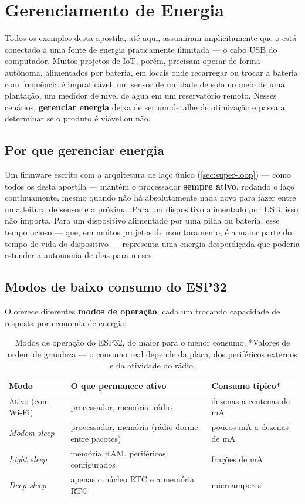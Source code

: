 \chapter{Gerenciamento de Energia}
\label{cap:energia}

Todos os exemplos desta apostila, até aqui, assumiram implicitamente que o \ESP{} está conectado a uma fonte de energia praticamente ilimitada — o cabo USB do computador. Muitos projetos de IoT, porém, precisam operar de forma autônoma, alimentados por bateria, em locais onde recarregar ou trocar a bateria com frequência é impraticável: um sensor de umidade de solo no meio de uma plantação, um medidor de nível de água em um reservatório remoto. Nesses cenários, \textbf{gerenciar energia} deixa de ser um detalhe de otimização e passa a determinar se o produto é viável ou não.

\section{Por que gerenciar energia}

Um firmware escrito com a arquitetura de laço único (\cref{sec:super-loop}) — como todos os desta apostila — mantém o processador \textbf{sempre ativo}, rodando o laço  continuamente, mesmo quando não há absolutamente nada novo para fazer entre uma leitura de sensor e a próxima. Para um dispositivo alimentado por USB, isso não importa. Para um dispositivo alimentado por uma pilha ou bateria, esse tempo ocioso — que, em muitos projetos de monitoramento, é a maior parte do tempo de vida do dispositivo — representa uma energia desperdiçada que poderia estender a autonomia de dias para meses.

\section{Modos de baixo consumo do ESP32}

O \ESP{} oferece diferentes \textbf{modos de operação}, cada um trocando capacidade de resposta por economia de energia:

\begin{table}[h]
\centering
\begin{tabularx}{\textwidth}{@{}lXX@{}}
\toprule
\textbf{Modo} & \textbf{O que permanece ativo} & \textbf{Consumo típico*} \\
\midrule
Ativo (com Wi-Fi)  & processador, memória, rádio  & dezenas a centenas de mA \\
\emph{Modem-sleep}  & processador, memória (rádio dorme entre pacotes) & poucos mA a dezenas de mA \\
\emph{Light sleep}  & memória RAM, periféricos configurados & frações de mA \\
\emph{Deep sleep}   & apenas o núcleo RTC e a memória RTC & microamperes \\
\bottomrule
\end{tabularx}
\caption{Modos de operação do ESP32, do maior para o menor consumo. *Valores de ordem de grandeza — o consumo real depende da placa, dos periféricos externos e da atividade do rádio.}
\end{table}

